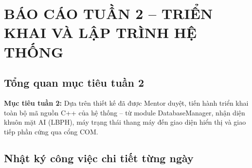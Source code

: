 \documentclass[12pt,a4paper]{article}
\begin{document}
\newpage

\section{BÁO CÁO TUẦN 2 -- TRIỂN KHAI VÀ LẬP TRÌNH HỆ THỐNG}

\subsection{Tổng quan mục tiêu tuần 2}

\begin{weekframe}
\textbf{Mục tiêu tuần 2:} Dựa trên thiết kế đã được Mentor duyệt, tiến hành triển khai toàn bộ mã nguồn C++ của hệ thống -- từ module DatabaseManager, nhận diện khuôn mặt AI (LBPH), máy trạng thái thang máy đến giao diện hiển thị và giao tiếp phần cứng qua cổng COM.
\end{weekframe}

\vspace{0.5cm}

\subsection{Nhật ký công việc chi tiết từng ngày}
\end{document}
